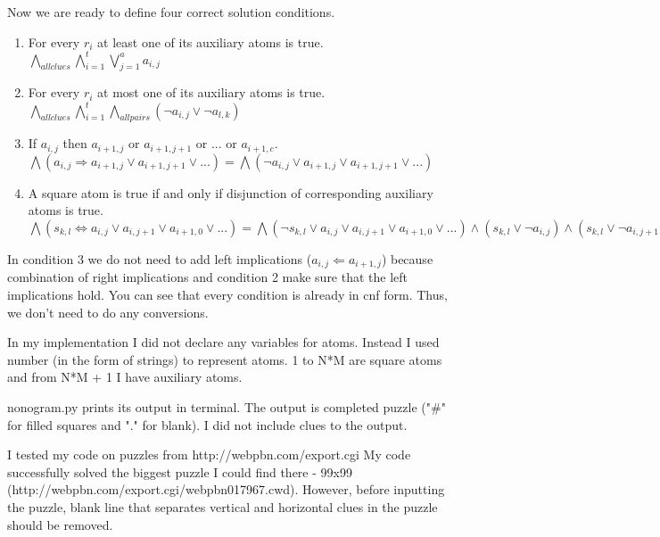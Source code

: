 \documentclass{article}
\begin{document}
Now we are ready to define four correct solution conditions.
\begin{enumerate}
    \item For every $r_i$ at least one of its auxiliary atoms is true.\\
    $\bigwedge_{all clues} \bigwedge_{i=1}^t \bigvee_{j=1}^a a_{i,j}$
    \item For every $r_i$ at most one of its auxiliary atoms is true.\\
    $\bigwedge_{all clues} \bigwedge_{i=1}^t \bigwedge_{all pairs} (\neg a_{i, j} \vee \neg a_{l, k})$
    \item If $a_{i,j}$ then $a_{i+1,j}$ or $a_{i+1,j+1}$ or ... or $a_{i+1,c}$.\\
    $\bigwedge (a_{i,j} \Rightarrow a_{i+1,j} \vee a_{i+1,j+1} \vee ...) = \bigwedge (\neg a_{i,j} \vee a_{i+1,j} \vee a_{i+1,j+1} \vee ...)$
    \item A square atom is true if and only if disjunction of corresponding auxiliary atoms is true.
    $\bigwedge (s_{k,l} \iff a_{i,j} \vee a_{i,j+1} \vee a_{i+1,0} \vee ...) = \bigwedge (\neg s_{k,l} \vee a_{i,j} \vee a_{i,j+1} \vee a_{i+1,0} \vee ...) \wedge (s_{k,l} \vee \neg a_{i,j}) \wedge (s_{k,l} \vee \neg a_{i,j+1}) \wedge ...$
\end{enumerate}

In condition 3 we do not need to add left implications ($a_{i,j} \Leftarrow a_{i+1,j}$) because combination of right implications and condition 2 make sure that the left implications hold. You can see that every condition is already in cnf form. Thus, we don't need to do any conversions.

In my implementation I did not declare any variables for atoms. Instead I used number (in the form of strings) to represent atoms. 1 to N*M are square atoms and from N*M + 1 I have auxiliary atoms.

nonogram.py prints its output in terminal. The output is completed puzzle ("\#" for filled squares and "." for blank). I did not include clues to the output.

I tested my code on puzzles from http://webpbn.com/export.cgi My code successfully solved the biggest puzzle I could find there - 99x99\\ (http://webpbn.com/export.cgi/webpbn017967.cwd). However, before inputting the puzzle, blank line that separates vertical and horizontal clues in the puzzle should be removed.
\end{document}
